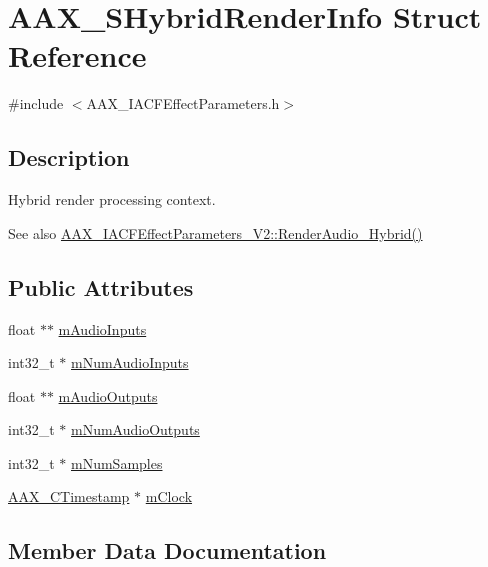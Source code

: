 \hypertarget{a01673}{}\section{A\+A\+X\+\_\+\+S\+Hybrid\+Render\+Info Struct Reference}
\label{a01673}


{\ttfamily \#include $<$A\+A\+X\+\_\+\+I\+A\+C\+F\+Effect\+Parameters.\+h$>$}



\subsection{Description}
Hybrid render processing context. 

\begin{DoxySeeAlso}{See also}
\mbox{\hyperlink{a00805_gae6139041de22f51f3146d26a01c54c1b}{A\+A\+X\+\_\+\+I\+A\+C\+F\+Effect\+Parameters\+\_\+\+V2\+::\+Render\+Audio\+\_\+\+Hybrid()}} 
\end{DoxySeeAlso}
\subsection*{Public Attributes}
\begin{DoxyCompactItemize}
\item 
float $\ast$$\ast$ \mbox{\hyperlink{a01673_aa1c8e11d2520d947d2d5a9a6df749010}{m\+Audio\+Inputs}}
\item 
int32\+\_\+t $\ast$ \mbox{\hyperlink{a01673_a92940f656974c46e74f4e4dfb7853b05}{m\+Num\+Audio\+Inputs}}
\item 
float $\ast$$\ast$ \mbox{\hyperlink{a01673_a170d77de5fcef4fdbd80ba215c9df149}{m\+Audio\+Outputs}}
\item 
int32\+\_\+t $\ast$ \mbox{\hyperlink{a01673_a512b8e935b80452a74c8b39bcb53bf6e}{m\+Num\+Audio\+Outputs}}
\item 
int32\+\_\+t $\ast$ \mbox{\hyperlink{a01673_a57a29e2772721e1c9276b9114dc212a2}{m\+Num\+Samples}}
\item 
\mbox{\hyperlink{a00392_aae7325dbfa53a983f208a68cb563fba5}{A\+A\+X\+\_\+\+C\+Timestamp}} $\ast$ \mbox{\hyperlink{a01673_ad98d7a8b5a0cfee06b31a81fe9ebe7fb}{m\+Clock}}
\end{DoxyCompactItemize}


\subsection{Member Data Documentation}
\mbox{\label{a01673_aa1c8e11d2520d947d2d5a9a6df749010}} 
